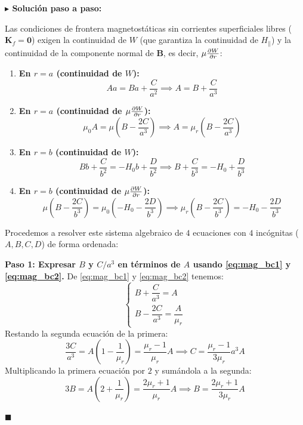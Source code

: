 \documentclass[11pt,a4paper]{book}
\newenvironment{solucion}{%
    \par\medskip\noindent\textbf{\color{blue!65!black}\Large $\blacktriangleright$ Solución paso a paso:}\par\medskip
}{%
    \hfill$\blacksquare$\par\bigskip
}
\newcommand{\Bvec}{\bm{B}}
\begin{document}
\begin{solucion}
Las condiciones de frontera magnetostáticas sin corrientes superficiales libres ($\bm{K}_f = \bm{0}$) exigen la continuidad de $W$ (que garantiza la continuidad de $H_\parallel$) y la continuidad de la componente normal de $\Bvec$, es decir, $\mu \pdv{W}{r}$:
\begin{enumerate}
    \item \textbf{En $r = a$ (continuidad de $W$):}
    \begin{equation}
        A a = B a + \frac{C}{a^2} \implies A = B + \frac{C}{a^3} \label{eq:mag_bc1}
    \end{equation}
    \item \textbf{En $r = a$ (continuidad de $\mu \pdv{W}{r}$):}
    \begin{equation}
        \mu_0 A = \mu \left( B - \frac{2C}{a^3} \right) \implies A = \mu_r \left( B - \frac{2C}{a^3} \right) \label{eq:mag_bc2}
    \end{equation}
    \item \textbf{En $r = b$ (continuidad de $W$):}
    \begin{equation}
        B b + \frac{C}{b^2} = -H_0 b + \frac{D}{b^2} \implies B + \frac{C}{b^3} = -H_0 + \frac{D}{b^3} \label{eq:mag_bc3}
    \end{equation}
    \item \textbf{En $r = b$ (continuidad de $\mu \pdv{W}{r}$):}
    \begin{equation}
        \mu \left( B - \frac{2C}{b^3} \right) = \mu_0 \left( -H_0 - \frac{2D}{b^3} \right) \implies \mu_r \left( B - \frac{2C}{b^3} \right) = -H_0 - \frac{2D}{b^3} \label{eq:mag_bc4}
    \end{equation}
\end{enumerate}

Procedemos a resolver este sistema algebraico de $4$ ecuaciones con $4$ incógnitas ($A,B,C,D$) de forma ordenada:

\textbf{Paso 1: Expresar $B$ y $C/a^3$ en términos de $A$ usando \eqref{eq:mag_bc1} y \eqref{eq:mag_bc2}.}
De \eqref{eq:mag_bc1} y \eqref{eq:mag_bc2} tenemos:
\begin{equation}
    \begin{cases}
        B + \dfrac{C}{a^3} = A \\[8pt]
        B - \dfrac{2C}{a^3} = \dfrac{A}{\mu_r}
    \end{cases}
\end{equation}
Restando la segunda ecuación de la primera:
\begin{equation}
    \frac{3C}{a^3} = A\left(1 - \frac{1}{\mu_r}\right) = \frac{\mu_r - 1}{\mu_r} A \implies C = \frac{\mu_r - 1}{3\mu_r} a^3 A
\end{equation}
Multiplicando la primera ecuación por $2$ y sumándola a la segunda:
\begin{equation}
    3B = A\left(2 + \frac{1}{\mu_r}\right) = \frac{2\mu_r + 1}{\mu_r} A \implies B = \frac{2\mu_r + 1}{3\mu_r} A
\end{equation}


\end{solucion}
\end{document}
